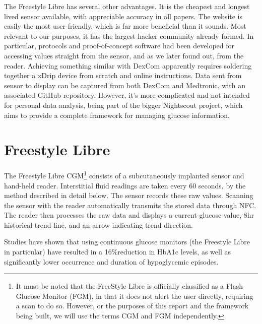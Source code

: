 The Freestyle Libre has several other advantages. It is the cheapest and longest lived sensor available, with appreciable accuracy in all papers. The website is easily the most user-friendly, which is far more beneficial than it sounds. Most relevant to our purposes, it has the largest hacker community already formed. In particular, protocols and proof-of-concept software had been developed for accessing values straight from the sensor, and as we later found out, from the reader. Achieving something similar with DexCom apparently requires soldering together a xDrip device from scratch and online instructions. Data sent from sensor to display can be captured from both DexCom and Medtronic, with an associated GitHub repository. However, it’s more complicated and not intended for personal data analysis, being part of the bigger Nightscout\cite{noauthor_nightscout_nodate} project, which aims to provide a complete framework for managing glucose information.

\section{Freestyle Libre}
The Freestyle Libre CGM\footnote{It must be noted that the FreeStyle Libre is officially classified as a Flash Glucose Monitor (FGM), in that it does not alert the user directly, requiring a scan to do so. However, or the purposes of this report and the framework being built, we will use the terms CGM and FGM independently.} consists of a subcutaneously implanted sensor and hand-held reader. Interstitial fluid readings are taken every 60 seconds, by the method described in detail below. The sensor records these raw values. Scanning the sensor with the reader automatically transmits the stored data through NFC. The reader then processes the raw data and displays a current glucose value, 8hr historical trend line, and an arrow indicating trend direction.

Studies have shown \cite{abbott_real-world_nodate} that using continuous glucose monitors (the Freestyle Libre in particular) have resulted in a 16\%reduction in HbA1c levels, as well as significantly lower occurrence and duration of hypoglycemic episodes.